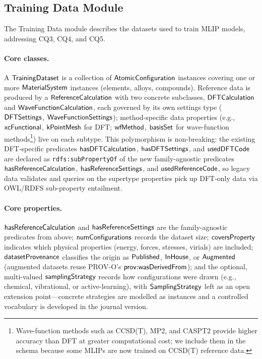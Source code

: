 \subsection{Training Data Module}
\label{sec:training-data-module}

The Training Data module describes the datasets used to train MLIP models,
addressing CQ3, CQ4, and CQ5.

\paragraph{Core classes.}
A $\mathsf{TrainingDataset}$ is a collection of $\mathsf{AtomicConfiguration}$
instances covering one or more $\mathsf{MaterialSystem}$ instances
(elements, alloys, compounds). Reference data is produced by a
$\mathsf{ReferenceCalculation}$ with two concrete subclasses,
$\mathsf{DFTCalculation}$ and $\mathsf{WaveFunctionCalculation}$, each governed by
its own settings type ($\mathsf{DFTSettings}$, $\mathsf{WaveFunctionSettings}$);
method-specific data properties (e.g., $\mathsf{xcFunctional}$,
$\mathsf{kPointMesh}$ for DFT; $\mathsf{wfMethod}$, $\mathsf{basisSet}$ for
wave-function methods\footnote{Wave-function methods such as
CCSD(T), MP2, and CASPT2 provide higher accuracy than DFT at greater
computational cost; we include them in the schema because some MLIPs
are now trained on CCSD(T) reference data.}) live on each subtype.
This polymorphism is non-breaking: the existing DFT-specific
predicates $\mathsf{hasDFTCalculation}$, $\mathsf{hasDFTSettings}$, and
$\mathsf{usedDFTCode}$ are declared as
\texttt{rdfs:subPropertyOf} of the new family-agnostic predicates
$\mathsf{hasReferenceCalculation}$, $\mathsf{hasReferenceSettings}$, and
$\mathsf{usedReferenceCode}$, so legacy data validates and queries on
the supertype properties pick up DFT-only data via OWL/RDFS sub-property
entailment.

\paragraph{Core properties.}
$\mathsf{hasReferenceCalculation}$ and $\mathsf{hasReferenceSettings}$ are the
family-agnostic predicates from above;
$\mathsf{numConfigurations}$ records the dataset size;
$\mathsf{coversProperty}$ indicates which physical properties
(energy, forces, stresses, virials) are included;
$\mathsf{datasetProvenance}$ classifies the origin
as $\mathsf{Published}$, $\mathsf{InHouse}$, or
$\mathsf{Augmented}$ (augmented datasets reuse PROV-O's
\mbox{$\mathsf{prov{:}wasDerivedFrom}$}); and the optional, multi-valued
$\mathsf{samplingStrategy}$ records how configurations were drawn (e.g.,
chemical, vibrational, or active-learning), with
$\mathsf{SamplingStrategy}$ left as an open extension point---concrete
strategies are modelled as instances and a controlled vocabulary is
developed in the journal version.

